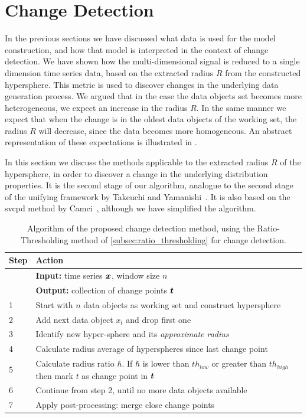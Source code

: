 \section{Change Detection}\label{sec:method_change_detection}
In the previous sections we have discussed what data is used for the model construction, and how that model is interpreted in the context of change detection.
We have shown how the multi-dimensional signal is reduced to a single dimension time series data, based on the extracted radius $R$ from the constructed hypersphere.
This metric is used to discover changes in the underlying data generation process.
We argued that in the case the data objects set becomes more heterogeneous, we expect an increase in the radius $R$.
In the same manner we expect that when the change is in the oldest data objects of the working set, the radius $R$ will decrease, since the data becomes more homogeneous.
An abstract representation of these expectations is illustrated in .

In this section we discuss the methods applicable to the extracted radius $R$ of the hypersphere, in order to discover a change in the underlying distribution properties.
It is the second stage of our algorithm, analogue to the second stage of the unifying framework by Takeuchi and Yamanishi~\cite{takeuchi2006unifying}.
It is also based on the \gls{svcpd} method by Camci~\cite{camci2010change}, although we have simplified the algorithm.

\begin{table}
\begin{center}
  \caption[Proposed algorithm]{Algorithm of the proposed change detection method, using the Ratio-Thresholding method of \ref{subsec:ratio_thresholding} for change detection.}
  \begin{tabular}{ l p{12cm} }
    \hline
    Step & Action \\
    \hline
    & \textbf{Input:} time series $\vectorsym{x}$, window size $n$ \\
    & \textbf{Output:} collection of change points $\vectorsym{t}$ \\
    1 & Start with $n$ data objects as working set and construct hypersphere \\
    2 & Add next data object $x_t$ and drop first one \\
    3 & Identify new hyper-sphere and its \emph{approximate radius} \\
    4 & Calculate radius average of hyperspheres since last change point \\
    5 & Calculate radius ratio $\hbar$. \newline
    If $\hbar$ is  lower than ${th}_{low}$ or greater than ${th}_{high}$ then mark $t$ as change point in $\vectorsym{t}$ \\
    6 & Continue from step 2, until no more data objects available \\
    7 & Apply post-processing: merge close change points \\
    \hline
  \end{tabular}
  \label{tab:algorithm_proposed_method}
\end{center}
\end{table}

